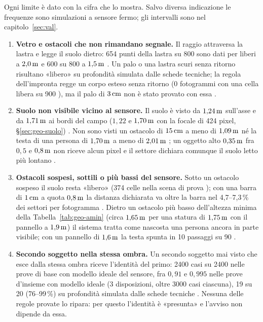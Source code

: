 Ogni limite è dato con la cifra che lo mostra. Salvo diversa indicazione le frequenze sono simulazioni a sensore fermo; gli intervalli sono nel capitolo~\ref{sec:val}.
\begin{enumerate}[label=\arabic*.,ref=\arabic*,leftmargin=1.8em]
\item \textbf{Vetro e ostacoli che non rimandano segnale.} Il raggio attraversa la lastra e legge il suolo dietro: 654 punti della lastra su 800 sono dati per liberi a $2{,}0\,\mathrm{m}$ e 600 su 800 a $1{,}5\,\mathrm{m}$ . Un palo o una lastra scuri senza ritorno risultano «libero» su profondità simulata dalle schede tecniche; la regola dell'impronta regge un corpo esteso senza ritorno (0 fotogrammi con una cella libera su 900 ), ma il palo di $3\,\mathrm{cm}$ non è stato provato con essa .
\item \textbf{Suolo non visibile vicino al sensore.} Il suolo è visto da $1{,}24\,\mathrm{m}$ sull'asse e da $1{,}71\,\mathrm{m}$ ai bordi del campo ($1{,}22$ e $1{,}70\,\mathrm{m}$ con la focale di 424 pixel, \S\ref{sec:geo-suolo}) . Non sono visti un ostacolo di $15\,\mathrm{cm}$ a meno di $1{,}09\,\mathrm{m}$ né la testa di una persona di $1{,}70\,\mathrm{m}$ a meno di $2{,}01\,\mathrm{m}$ ; un oggetto alto $0{,}35\,\mathrm{m}$ fra $0{,}5$ e $0{,}8\,\mathrm{m}$ non riceve alcun pixel e il settore dichiara comunque il suolo letto più lontano .
\item \textbf{Ostacoli sospesi, sottili o più bassi del sensore.} Sotto un ostacolo sospeso il suolo resta «libero» (374 celle nella scena di prova ); con una barra di $1\,\mathrm{cm}$ a quota $0{,}8\,\mathrm{m}$ la distanza dichiarata va oltre la barra nel 4,7--7,3\,\% dei settori per fotogramma . Dietro un ostacolo più basso dell'altezza minima della Tabella~\ref{tab:geo-amin} (circa $1{,}65\,\mathrm{m}$ per una statura di $1{,}75\,\mathrm{m}$ con il pannello a $1{,}9\,\mathrm{m}$) il sistema tratta come nascosta una persona ancora in parte visibile; con un pannello di $1{,}6\,\mathrm{m}$ la testa spunta in 10 passaggi su 90 .
\item \textbf{Secondo soggetto nella stessa ombra.} Un secondo soggetto mai visto che esce dalla stessa ombra riceve l'identità del primo: 2400 casi su 2400 nelle prove di base con modello ideale del sensore, fra $0{,}91$ e $0{,}995$ nelle prove d'insieme con modello ideale (3 disposizioni, oltre 3000 casi ciascuna), 19 su 20 (76--99\,\%) su profondità simulata dalle schede tecniche . Nessuna delle regole provate lo ripara: per questo l'identità è «presunta» e l'avviso non dipende da essa.

\end{enumerate}
